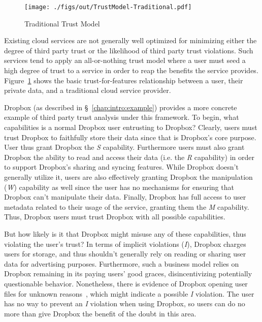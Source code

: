 \begin{figure}[t]
  \centering
  \texttt{[image: ./figs/out/TrustModel-Traditional.pdf]}
  \caption{Traditional Trust Model}
  \label{fig:trust-traditional}
\end{figure}

Existing cloud services are not generally well optimized for
minimizing either the degree of third party trust or the likelihood of
third party trust violations. Such services tend to apply an
all-or-nothing trust model where a user must seed a high degree of
trust to a service in order to reap the benefits the service
provides. Figure~\ref{fig:trust-traditional} shows the basic
trust-for-features relationship between a user, their private data,
and a traditional cloud service provider.

Dropbox (as described in \S~\ref{chap:intro:example}) provides a more
concrete example of third party trust analysis under this
framework. To begin, what capabilities is a normal Dropbox user
entrusting to Dropbox? Clearly, users must trust Dropbox to faithfully
store their data since that is Dropbox's core purpose. User thus grant
Dropbox the \emph{S} capability. Furthermore users must also grant
Dropbox the ability to read and access their data (i.e. the \emph{R}
capability) in order to support Dropbox's sharing and syncing
features. While Dropbox doesn't generally utilize it, users are also
effectively granting Dropbox the manipulation (\emph{W}) capability as
well since the user has no mechanisms for ensuring that Dropbox can't
manipulate their data. Finally, Dropbox has full access to user
metadata related to their usage of the service, granting them the
\emph{M} capability. Thus, Dropbox users must trust Dropbox with all
possible capabilities.

But how likely is it that Dropbox might misuse any of these
capabilities, thus violating the user's trust? In terms of implicit
violations (\emph{I}), Dropbox charges users for storage, and thus
shouldn't generally rely on reading or sharing user data for
advertising purposes. Furthermore, such a business model relies on
Dropbox remaining in its paying users' good graces, disincentivizing
potentially questionable behavior. Nonetheless, there is evidence of
Dropbox opening user files for unknown
reasons~\cite{vintsurf-dropbox}, which might indicate a possible
\emph{I} violation. The user has no way to prevent an \emph{I}
violation when using Dropbox, so users can do no more than give
Dropbox the benefit of the doubt in this area.

